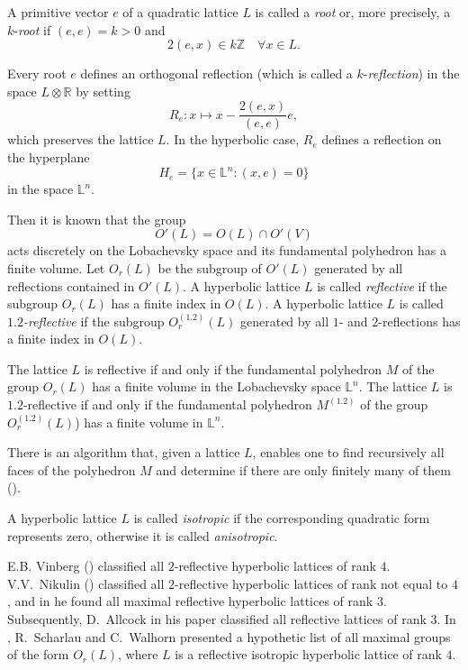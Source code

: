 \documentclass[14pt]{article}
\begin{document}
A primitive vector $e$ of a quadratic lattice $L$ is
called a \textit{root} or, more precisely, a
$k$-\textit{root} if $(e,e)=k > 0$ and
$$
2(e, x) \in k \mathbb{Z} \quad \forall x \in L.
$$

Every root $e$ defines an orthogonal reflection (which is called
a $k$-\textit{reflection}) in the space $L \otimes \mathbb{R}$ by setting
$$
R_e \colon x \mapsto x - \dfrac{2(e, x)}{(e, e)} e,
$$
which preserves the lattice $L$. In the hyperbolic case, $R_e$ defines
a reflection on the hyperplane
$$
H_e =\{ x \in \mathbb{L}^n \colon (x,e) = 0\}
$$
in the space $\mathbb{L}^n$.

Then it is known that the group
$$
O '(L) = O (L) \cap O' (V)
$$
acts discretely on the Lobachevsky space and its fundamental polyhedron
has a finite volume.
Let $O_r (L)$ be the subgroup of $O '(L)$ generated by all
reflections contained in $O '(L)$. A hyperbolic lattice $L$ is called
\textit{reflective} if the subgroup $O_r (L)$  has a finite index in $O (L)$.
A hyperbolic lattice $L$ is called \textit{$1.2$-reflective}
if the subgroup $O^{(1.2)}_r (L)$ generated
by all $1$- and $2$-reflections  has a finite index in $O (L)$.


The lattice $L$ is reflective
if and only if the fundamental
polyhedron $M$ of the group $O_r (L)$ has a finite
volume in the Lobachevsky space $\mathbb{L}^n$.
The lattice $L$ is $1.2$-reflective
if and only if the fundamental
polyhedron $M ^ {(1.2)}$ of the group $O^{(1.2)}_r (L)$) has a finite
volume in $\mathbb{L}^n$.


There is an algorithm that, given a lattice $L$, enables
one to find recursively all faces of the polyhedron $M$ and determine
if there are only finitely many of them (\cite{vinberg73descrgr, vinberg72unitgr}).

A hyperbolic lattice $L$ is called \textit{isotropic} if the corresponding
quadratic form represents zero, otherwise it is called \textit{anisotropic}.

E.B. Vinberg (\cite{vinberg07classhyplat}) classified all $2$-reflective
hyperbolic lattices of rank $4$.
V.V.~Nikulin (\cite{nikulin81factor, nikulin84spacek3}) classified all
$2$-reflective hyperbolic lattices of
rank not equal to $4$, and  in \cite{nikulin2000hyp-root-sys}
he found all maximal reflective hyperbolic lattices of rank $3$.
Subsequently, D.~Allcock in his paper \cite{allcock2012refl-lat-3} classified
all reflective lattices of rank $3$.
In \cite{scharlauwalhorn92}, R.~Scharlau and C.~Walhorn presented  a
hypothetic list of all
maximal groups of the form $O_r (L)$, where $L$ is a reflective
isotropic hyperbolic lattice of rank $4$.
\end{document}
